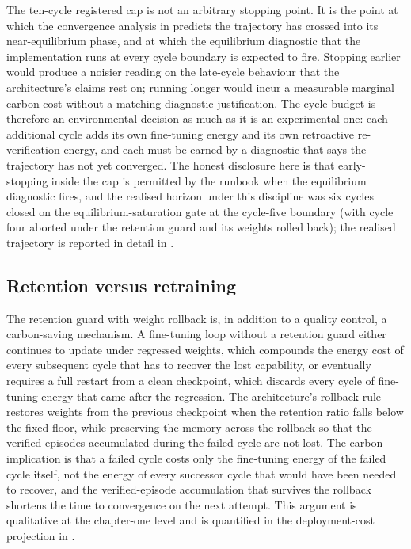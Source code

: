 The ten-cycle registered cap is not an arbitrary stopping point. It is the point at which the convergence analysis in  predicts the trajectory has crossed into its near-equilibrium phase, and at which the equilibrium diagnostic that the implementation runs at every cycle boundary is expected to fire. Stopping earlier would produce a noisier reading on the late-cycle behaviour that the architecture's claims rest on; running longer would incur a measurable marginal carbon cost without a matching diagnostic justification. The cycle budget is therefore an environmental decision as much as it is an experimental one: each additional cycle adds its own fine-tuning energy and its own retroactive re-verification energy, and each must be earned by a diagnostic that says the trajectory has not yet converged. The honest disclosure here is that early-stopping inside the cap is permitted by the runbook when the equilibrium diagnostic fires, and the realised horizon under this discipline was six cycles closed on the equilibrium-saturation gate at the cycle-five boundary (with cycle four aborted under the retention guard and its weights rolled back); the realised trajectory is reported in detail in .

\subsection{Retention versus retraining}
\label{sec:env-retention}

The retention guard with weight rollback is, in addition to a quality control, a carbon-saving mechanism. A fine-tuning loop without a retention guard either continues to update under regressed weights, which compounds the energy cost of every subsequent cycle that has to recover the lost capability, or eventually requires a full restart from a clean checkpoint, which discards every cycle of fine-tuning energy that came after the regression. The architecture's rollback rule restores weights from the previous checkpoint when the retention ratio falls below the fixed floor, while preserving the memory across the rollback so that the verified episodes accumulated during the failed cycle are not lost. The carbon implication is that a failed cycle costs only the fine-tuning energy of the failed cycle itself, not the energy of every successor cycle that would have been needed to recover, and the verified-episode accumulation that survives the rollback shortens the time to convergence on the next attempt. This argument is qualitative at the chapter-one level and is quantified in the deployment-cost projection in .

